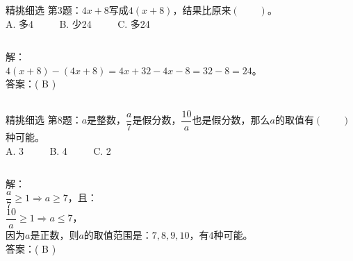 \documentclass[aspectratio=169]{ctexbeamer} %
\begin{document}
\begin{frame}[t]{精挑细选}
第3题：$4x + 8$写成$4(x+8)$，结果比原来$(\qquad)$。\\
A. 多4 $\qquad$ B. 少24 $\qquad$ C. 多24 \\
\pause
\vspace{1em}
\begin{columns}
\vspace{1em}
解：\\
$4(x+8) - (4x+8) = 4x + 32 - 4x - 8 = 32 - 8 = 24$。\\
\vspace{1em}
答案：\alert{( B )}
\end{columns}
\end{frame}


\begin{frame}[t]{精挑细选}
第8题：$a$是整数，$\dfrac{a}{7}$是假分数，$\dfrac{10}{a}$也是假分数，那么$a$的取值有$(\qquad)$种可能。\\
A. 3 $\qquad$ B. 4 $\qquad$ C. 2 \\
\pause
\vspace{1em}
\begin{columns}
\vspace{1em}
解：\\
$\dfrac{a}{7} \ge 1 \Rightarrow a \ge 7$，且：\\
$\dfrac{10}{a} \ge 1 \Rightarrow a \le 7$，\\
因为$a$是正数，则$a$的取值范围是：$7, 8, 9, 10$，有4种可能。\\
\vspace{1em}
答案：\alert{( B )}
\end{columns}
\end{frame}
\end{document}
